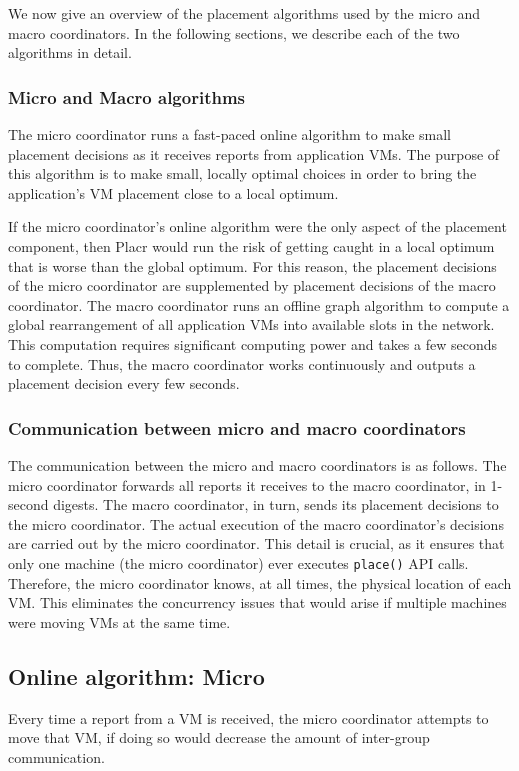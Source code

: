 \documentclass[11pt]{article}
\begin{document}
We now give an overview of the placement algorithms used by the micro and macro coordinators.  In the following sections, we describe each of the two algorithms in detail.

\subsubsection{Micro and Macro algorithms}

The micro coordinator runs a fast-paced online algorithm to make small placement decisions as it receives reports from application VMs.  The purpose of this algorithm is to make small, locally optimal choices in order to bring the application's VM placement close to a local optimum.

If the micro coordinator's online algorithm were the only aspect of the placement component, then Placr would run the risk of getting caught in a local optimum that is worse than the global optimum.  For this reason, the placement decisions of the micro coordinator are supplemented by placement decisions of the macro coordinator.  The macro coordinator runs an offline graph algorithm to compute a global rearrangement of all application VMs into available slots in the network.  This computation requires significant computing power and takes a few seconds to complete.  Thus, the macro coordinator works continuously and outputs a placement decision every few seconds.

\subsubsection{Communication between micro and macro coordinators}

The communication between the micro and macro coordinators is as follows.  The micro coordinator forwards all reports it receives to the macro coordinator, in 1-second digests.  The macro coordinator, in turn, sends its placement decisions to the micro coordinator.  The actual execution of the macro coordinator's decisions are carried out by the micro coordinator.  This detail is crucial, as it ensures that only one machine (the micro coordinator) ever executes {\tt place()} API calls.  Therefore, the micro coordinator knows, at all times, the physical location of each VM.  This eliminates the concurrency issues that would arise if multiple machines were moving VMs at the same time.


\subsection{Online algorithm: Micro}
\newcommand{\VMa}{\textit{VM}_a}
\newcommand{\VMb}{\textit{VM}_b}
Every time a report from a VM is received, the micro coordinator attempts to move that VM, if doing so would decrease the amount of inter-group communication.
\end{document}
